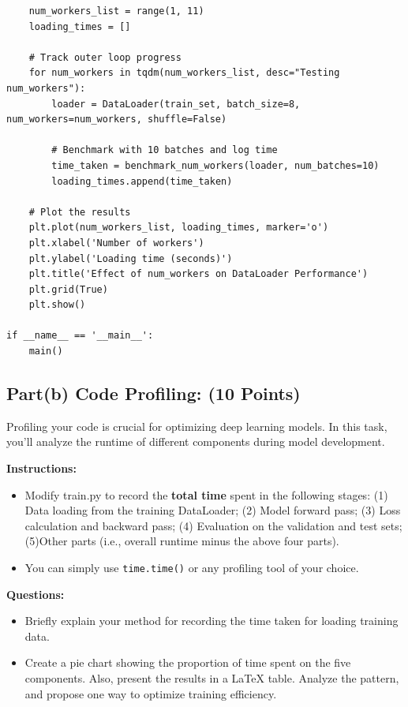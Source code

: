 \documentclass[11pt, oneside]{article}   	%
\begin{document}
\begin{lstlisting}
    num_workers_list = range(1, 11)
    loading_times = []
    
    # Track outer loop progress
    for num_workers in tqdm(num_workers_list, desc="Testing num_workers"):
        loader = DataLoader(train_set, batch_size=8, num_workers=num_workers, shuffle=False)
    
        # Benchmark with 10 batches and log time
        time_taken = benchmark_num_workers(loader, num_batches=10)
        loading_times.append(time_taken)
    
    # Plot the results
    plt.plot(num_workers_list, loading_times, marker='o')
    plt.xlabel('Number of workers')
    plt.ylabel('Loading time (seconds)')
    plt.title('Effect of num_workers on DataLoader Performance')
    plt.grid(True)
    plt.show()
    
if __name__ == '__main__':
    main()  
\end{lstlisting}

\newpage

\subsection*{Part(b) Code Profiling: (10 Points)}
Profiling your code is crucial for optimizing deep learning models. In this task, you’ll analyze the runtime of different components during model development.

\textbf{Instructions:}
\begin{itemize}
    \item Modify train.py to record the \textbf{total time} spent in the following stages: (1) Data loading from the training DataLoader; (2) Model forward pass; (3) Loss calculation and backward pass; (4) Evaluation on the validation and test sets; (5)Other parts (i.e., overall runtime minus the above four parts).
    \item You can simply use \texttt{time.time()} or any profiling tool of your choice.
\end{itemize}

\textbf{Questions:}
\begin{itemize}
    \item Briefly explain your method for recording the time taken for loading training data.
    \item Create a pie chart showing the proportion of time spent on the five components. Also, present the results in a LaTeX table. Analyze the pattern, and propose one way to optimize training efficiency.
\end{itemize}
\end{document}

